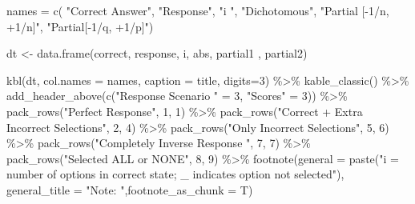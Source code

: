 \documentclass[
  letterpaper,
  DIV=11,
  numbers=noendperiod]{scrreprt}
\newenvironment{Shaded}{\begin{snugshade}}{\end{snugshade}}
\newcommand{\AttributeTok}[1]{\textcolor[rgb]{0.40,0.45,0.13}{#1}}
\newcommand{\DecValTok}[1]{\textcolor[rgb]{0.68,0.00,0.00}{#1}}
\newcommand{\FunctionTok}[1]{\textcolor[rgb]{0.28,0.35,0.67}{#1}}
\newcommand{\NormalTok}[1]{\textcolor[rgb]{0.00,0.23,0.31}{#1}}
\newcommand{\OtherTok}[1]{\textcolor[rgb]{0.00,0.23,0.31}{#1}}
\newcommand{\SpecialCharTok}[1]{\textcolor[rgb]{0.37,0.37,0.37}{#1}}
\newcommand{\StringTok}[1]{\textcolor[rgb]{0.13,0.47,0.30}{#1}}
\begin{document}
\begin{Shaded}
\begin{Highlighting}[]
\NormalTok{names }\OtherTok{=} \FunctionTok{c}\NormalTok{(    }\StringTok{"Correct Answer"}\NormalTok{,}
              \StringTok{"Response"}\NormalTok{,}
              \StringTok{"i "}\NormalTok{,}
              \StringTok{"Dichotomous"}\NormalTok{,}
              \StringTok{"Partial [{-}1/n, +1/n]"}\NormalTok{,}
              \StringTok{"Partial[{-}1/q, +1/p]"}\NormalTok{)}

\NormalTok{dt }\OtherTok{\textless{}{-}} \FunctionTok{data.frame}\NormalTok{(correct, response, i, abs, partial1 , partial2)}

\FunctionTok{kbl}\NormalTok{(dt, }\AttributeTok{col.names =}\NormalTok{ names, }\AttributeTok{caption =}\NormalTok{ title, }\AttributeTok{digits=}\DecValTok{3}\NormalTok{) }\SpecialCharTok{\%\textgreater{}\%}
  \FunctionTok{kable\_classic}\NormalTok{() }\SpecialCharTok{\%\textgreater{}\%}
    \FunctionTok{add\_header\_above}\NormalTok{(}\FunctionTok{c}\NormalTok{(}\StringTok{"Response Scenario "} \OtherTok{=} \DecValTok{3}\NormalTok{, }\StringTok{"Scores"} \OtherTok{=} \DecValTok{3}\NormalTok{)) }\SpecialCharTok{\%\textgreater{}\%} 
    \FunctionTok{pack\_rows}\NormalTok{(}\StringTok{"Perfect Response"}\NormalTok{, }\DecValTok{1}\NormalTok{, }\DecValTok{1}\NormalTok{) }\SpecialCharTok{\%\textgreater{}\%}
    \FunctionTok{pack\_rows}\NormalTok{(}\StringTok{"Correct + Extra Incorrect Selections"}\NormalTok{, }\DecValTok{2}\NormalTok{, }\DecValTok{4}\NormalTok{) }\SpecialCharTok{\%\textgreater{}\%}
    \FunctionTok{pack\_rows}\NormalTok{(}\StringTok{"Only Incorrect Selections"}\NormalTok{, }\DecValTok{5}\NormalTok{, }\DecValTok{6}\NormalTok{) }\SpecialCharTok{\%\textgreater{}\%}
    \FunctionTok{pack\_rows}\NormalTok{(}\StringTok{"Completely Inverse Response "}\NormalTok{, }\DecValTok{7}\NormalTok{, }\DecValTok{7}\NormalTok{) }\SpecialCharTok{\%\textgreater{}\%}
    \FunctionTok{pack\_rows}\NormalTok{(}\StringTok{"Selected ALL or NONE"}\NormalTok{, }\DecValTok{8}\NormalTok{, }\DecValTok{9}\NormalTok{) }\SpecialCharTok{\%\textgreater{}\%}
    \FunctionTok{footnote}\NormalTok{(}\AttributeTok{general =} \FunctionTok{paste}\NormalTok{(}\StringTok{"i = number of options in correct state; \_ indicates option not selected"}\NormalTok{),}
           \AttributeTok{general\_title =} \StringTok{"Note: "}\NormalTok{,}\AttributeTok{footnote\_as\_chunk =}\NormalTok{ T)}
\end{Highlighting}
\end{Shaded}
\end{document}
